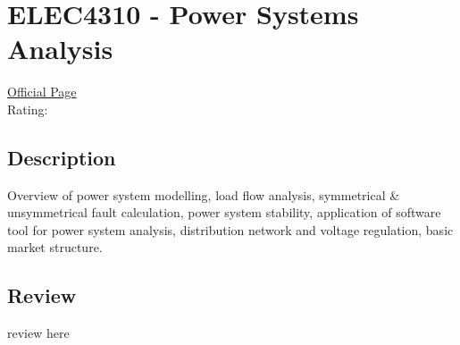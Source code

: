 \hypertarget{ELEC4310}{\section{ELEC4310 - Power Systems Analysis}}

\large
\textcolor{turbo_purple}{\href{https://my.uq.edu.au/programs-courses/course.html?course_code=ELEC4310}{Official Page}} \\
Rating: \cstar\cstar\cstar\cstar\ostar

\normalsize
\subsection*{Description}
Overview of power system modelling, load flow analysis, symmetrical \& unsymmetrical fault calculation, power system stability, application of software tool for power system analysis, distribution network and voltage regulation, basic market structure.

\subsection*{Review}
review here
